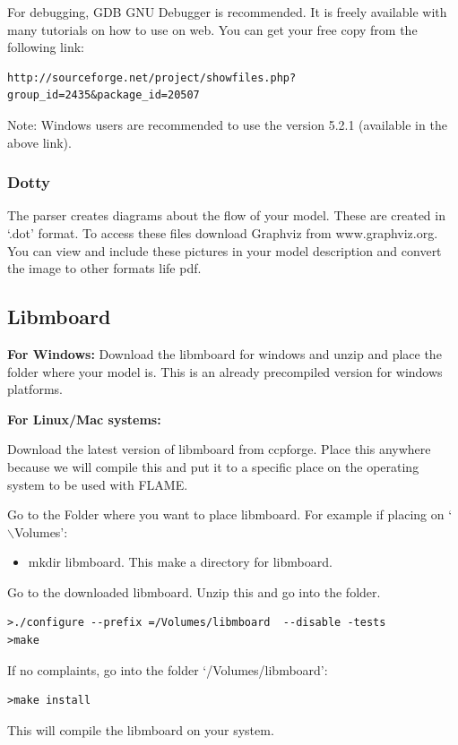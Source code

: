 \documentclass[a4paper,11pt]{article}
\newenvironment{mylisting}
{\begin{list}{}{\setlength{\leftmargin}{1em}}\item\small\bfseries}
{\end{list}}
\begin{document}
For debugging, GDB GNU Debugger is recommended. It is freely
available with many tutorials on how to use on web. You can get your
free copy from the following link:
\begin{mylisting}
\begin{verbatim}
http://sourceforge.net/project/showfiles.php?group_id=2435&package_id=20507
\end{verbatim}
\end{mylisting}

Note: Windows users are recommended to use the version 5.2.1
(available in the above link).


\subsubsection{Dotty}

The parser creates diagrams about the flow of your model. These are
created in `.dot' format. To access these files download Graphviz
from www.graphviz.org. You can view and include these pictures in
your model description and convert the image to other formats life
pdf.


\subsection{Libmboard}


\textbf{For Windows:} Download the libmboard for windows and unzip
and place the folder where your model is. This is an already
precompiled version for windows platforms.

\textbf{For Linux/Mac systems:} \begin{enumerate}

\item Download the latest version of libmboard from ccpforge. Place
this anywhere because we will compile this and put it to a specific
place on the operating system to be used with FLAME.

\item Go to the Folder where you want to place libmboard. For example
if placing on `$\backslash$Volumes':
\begin{itemize}
\item mkdir libmboard. This
make a directory for libmboard.
\end{itemize}

\item Go to the downloaded libmboard. Unzip this and go into the
folder.
\begin{mylisting}
\begin{verbatim}
>./configure --prefix =/Volumes/libmboard  --disable -tests
>make
\end{verbatim}
\end{mylisting}

If no complaints, go into the folder `/Volumes/libmboard':

\begin{mylisting}
\begin{verbatim}
>make install
\end{verbatim}
\end{mylisting}

This will compile the libmboard on your system.
\end{enumerate}
\end{document}
